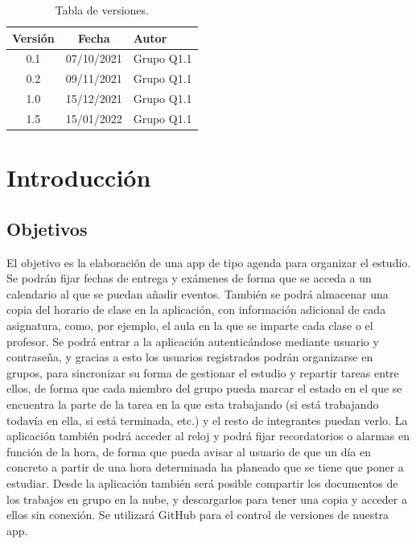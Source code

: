\documentclass[a4paper,openright,12pt]{article}
\begin{document}

\tableofcontents

\vspace{5cm}

\begin{flushright}
\begin{table}[hbtp]
\begin{center}

\caption{Tabla de versiones.}
\label{tabla:versiones}
\small
\vspace{1ex}

\begin{tabular}{|c|c|l|}
\hline
Versión & Fecha & Autor \\
\hline \hline
0.1 & 07/10/2021 & Grupo Q1.1 \\ \hline
0.2 & 09/11/2021 & Grupo Q1.1 \\ \hline
1.0 & 15/12/2021 & Grupo Q1.1 \\ \hline
1.5 & 15/01/2022 & Grupo Q1.1 \\ \hline
\end{tabular}

\end{center}
\end{table}
\end{flushright}


\newpage
{}


\section{Introducción}\label{cap.introduccion}

\subsection{Objetivos}
El objetivo es la elaboración de una app de tipo agenda para organizar el estudio. Se podrán fijar fechas de entrega y exámenes de forma que se acceda a un calendario al que se puedan añadir eventos. También se podrá almacenar una copia del horario de clase en la aplicación, con información adicional de cada asignatura, como, por ejemplo, el aula en la que se imparte cada clase o el profesor. Se podrá entrar a la aplicación autenticándose mediante usuario y contraseña, y gracias a esto los usuarios registrados podrán organizarse en grupos, para sincronizar su forma de gestionar el estudio y repartir tareas entre ellos, de forma que cada miembro del grupo pueda marcar el estado en el que se encuentra la parte de la tarea en la que esta trabajando (si está trabajando todavía en ella, si está terminada, etc.) y el resto de integrantes puedan verlo. La aplicación también podrá acceder al reloj y podrá fijar recordatorios o alarmas en función de la hora, de forma que pueda avisar al usuario de que un día en concreto a partir de una hora determinada ha planeado que se tiene que poner a estudiar. Desde la aplicación también será posible compartir los documentos de los trabajos en grupo en la nube, y descargarlos para tener una copia y acceder a ellos sin conexión.
Se utilizará GitHub para el control de versiones de nuestra app. \cite{misc-git}
\end{document}
